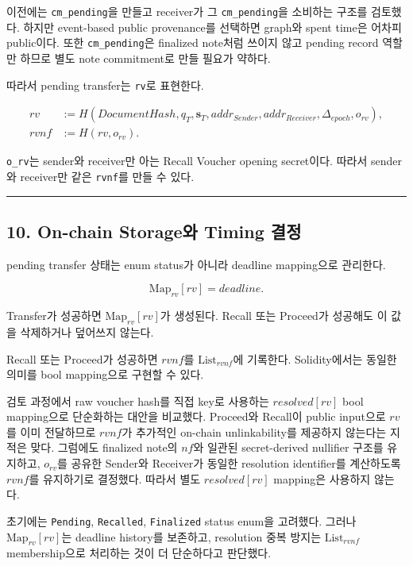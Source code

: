 \documentclass[11pt]{extarticle}
\newcommand{\List}[1]{\mathrm{List}_{#1}}
\newcommand{\Map}[1]{\mathrm{Map}_{#1}}
\begin{document}
이전에는 \texttt{cm\_pending}을 만들고 receiver가 그
\texttt{cm\_pending}을 소비하는 구조를 검토했다. 하지만 event-based
public provenance를 선택하면 graph와 spent time은 어차피 public이다.
또한 \texttt{cm\_pending}은 finalized note처럼 쓰이지 않고 pending
record 역할만 하므로 별도 note commitment로 만들 필요가 약하다.

따라서 pending transfer는 \texttt{rv}로 표현한다.

\[
\begin{aligned}
rv &:= H(\mathit{DocumentHash},q_T,\mathbf{s}_T,addr_{Sender},addr_{Receiver},
\Delta_{epoch},o_{rv}),\\
rvnf &:= H(rv,o_{rv}).
\end{aligned}
\]

\texttt{o\_rv}는 sender와 receiver만 아는 Recall Voucher opening
secret이다. 따라서 sender와 receiver만 같은 \texttt{rvnf}를 만들 수
있다.

\begin{center}\rule{0.5\linewidth}{0.5pt}\end{center}

\subsection{10. On-chain Storage와 Timing
결정}\label{10-on-chain-storageuxc640-timing-uxacb0uxc815}

pending transfer 상태는 enum status가 아니라 deadline mapping으로
관리한다.

\[
\Map{rv}[rv]=deadline.
\]

Transfer가 성공하면 $\Map{rv}[rv]$가 생성된다. Recall 또는 Proceed가
성공해도 이 값을 삭제하거나 덮어쓰지 않는다.

Recall 또는 Proceed가 성공하면 $rvnf$를 $\List{rvnf}$에 기록한다. Solidity에서는
동일한 의미를 bool mapping으로 구현할 수 있다.

검토 과정에서 raw voucher hash를 직접 key로 사용하는 $resolved[rv]$ bool mapping으로
단순화하는 대안을 비교했다. Proceed와 Recall이 public input으로 $rv$를 이미 전달하므로
$rvnf$가 추가적인 on-chain unlinkability를 제공하지 않는다는 지적은 맞다. 그럼에도
finalized note의 $nf$와 일관된 secret-derived nullifier 구조를 유지하고, $o_{rv}$를
공유한 Sender와 Receiver가 동일한 resolution identifier를 계산하도록 $rvnf$를
유지하기로 결정했다. 따라서 별도 $resolved[rv]$ mapping은 사용하지 않는다.

초기에는 \texttt{Pending}, \texttt{Recalled}, \texttt{Finalized} status
enum을 고려했다. 그러나 $\Map{rv}[rv]$는 deadline history를 보존하고,
resolution 중복 방지는 $\List{rvnf}$ membership으로 처리하는 것이 더 단순하다고
판단했다.
\end{document}

